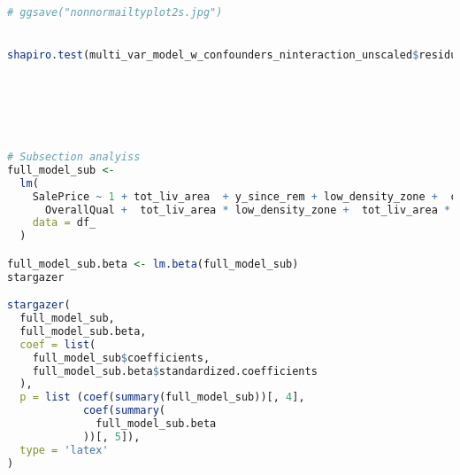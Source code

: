 \documentclass[a4paper]{article}
\begin{document}
\begin{lstlisting}[language=R]
# ggsave("nonnormailtyplot2s.jpg")


shapiro.test(multi_var_model_w_confounders_ninteraction_unscaled$residuals)






# Subsection analyiss
full_model_sub <-
  lm(
    SalePrice ~ 1 + tot_liv_area  + y_since_rem + low_density_zone +  commercial_zone + floating_zone + y_since_rem *
      OverallQual +  tot_liv_area * low_density_zone +  tot_liv_area * commercial_zone +  tot_liv_area * floating_zone ,
    data = df_
  )

full_model_sub.beta <- lm.beta(full_model_sub)
stargazer

stargazer(
  full_model_sub,
  full_model_sub.beta,
  coef = list(
    full_model_sub$coefficients,
    full_model_sub.beta$standardized.coefficients
  ),
  p = list (coef(summary(full_model_sub))[, 4],
            coef(summary(
              full_model_sub.beta
            ))[, 5]),
  type = 'latex'
)






\end{lstlisting}
\end{document}
